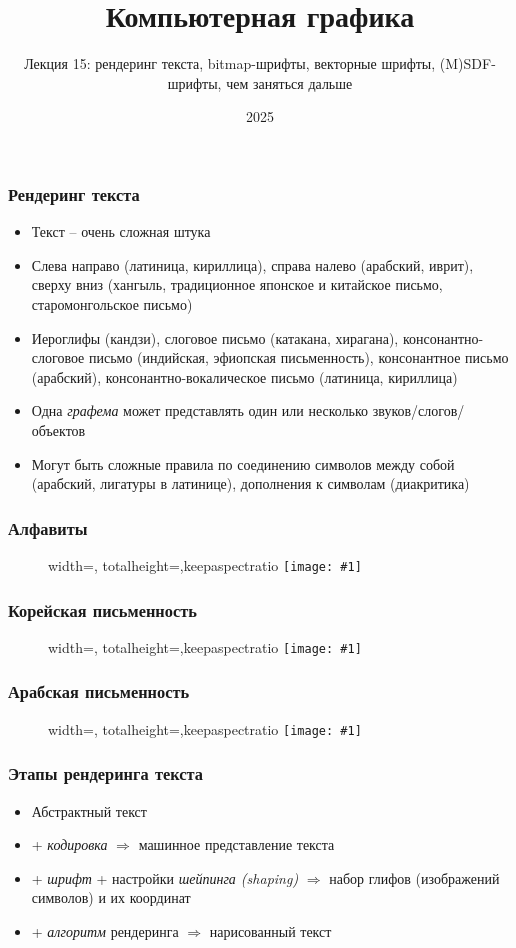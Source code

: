 \documentclass{beamer}
\title{Компьютерная графика}
\subtitle{Лекция 15: рендеринг текста, bitmap-шрифты, векторные шрифты, (M)SDF-шрифты, чем заняться дальше}
\date{2025}
\newcommand{\slideimage}[1]{
  \begin{figure}
    \begin{adjustbox}{width=\textwidth, totalheight=\textheight-2\baselineskip-2\baselineskip,keepaspectratio}
      \texttt{[image: \#1]}
    \end{adjustbox}
  \end{figure}
}
\begin{document}
\frame{\titlepage}

\begin{frame}[fragile]
\frametitle{Рендеринг текста}
\begin{itemize}
\item Текст -- очень сложная штука
\pause
\item Слева направо (латиница, кириллица), справа налево (арабский, иврит), сверху вниз (хангыль, традиционное японское и китайское письмо, старомонгольское письмо)
\pause
\item Иероглифы (кандзи), слоговое письмо (катакана, хирагана), консонантно-слоговое письмо (индийская, эфиопская письменность), консонантное письмо (арабский), консонантно-вокалическое письмо (латиница, кириллица)
\pause
\item Одна \textit{графема} может представлять один или несколько звуков/слогов/объектов
\pause
\item Могут быть сложные правила по соединению символов между собой (арабский, лигатуры в латинице), дополнения к символам (диакритика)
\end{itemize}
\end{frame}

\begin{frame}[fragile]
\frametitle{Алфавиты}
\slideimage{alphabet.jpg}
\end{frame}

\begin{frame}[fragile]
\frametitle{Корейская письменность}
\slideimage{korean.png}
\end{frame}

\begin{frame}[fragile]
\frametitle{Арабская письменность}
\slideimage{arabic.png}
\end{frame}

\begin{frame}[fragile]
\frametitle{Этапы рендеринга текста}
\begin{itemize}
\item Абстрактный текст
\pause
\item + \textit{кодировка} \begin{math}\Longrightarrow\end{math} машинное представление текста
\pause
\item + \textit{шрифт} + настройки \textit{шейпинга (shaping)} \begin{math}\Longrightarrow\end{math} набор глифов (изображений символов) и их координат
\pause
\item + \textit{алгоритм} рендеринга \begin{math}\Longrightarrow\end{math} нарисованный текст
\end{itemize}
\end{frame}
\end{document}
